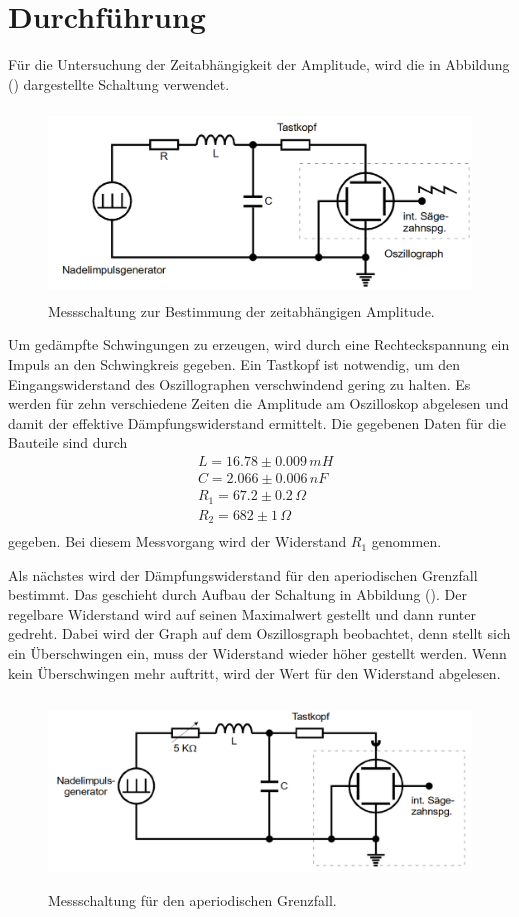 \section{Durchführung}
\label{sec:Durchführung}

Für die Untersuchung der Zeitabhängigkeit der Amplitude, wird die in Abbildung () dargestellte Schaltung verwendet.

\begin{figure}[H]
  \centering
  \includegraphics[height=5cm]{Schaltung1.png}
  \caption{Messschaltung zur Bestimmung der zeitabhängigen Amplitude. \cite[S. 11]{kent}}
\end{figure}
\noindent Um gedämpfte Schwingungen zu erzeugen, wird durch eine Rechteckspannung ein Impuls an den Schwingkreis gegeben.
Ein Tastkopf ist notwendig, um den Eingangswiderstand des Oszillographen verschwindend gering zu halten. 
Es werden für zehn verschiedene Zeiten die Amplitude am Oszilloskop abgelesen und damit der effektive Dämpfungswiderstand ermittelt.
Die gegebenen Daten für die Bauteile sind durch 
\begin{align*}
&L = 16.78 \pm 0.009 \, mH \\
&C = 2.066 \pm 0.006 \, nF \\
&R_1 = 67.2 \pm 0.2 \, \Omega \\
&R_2 = 682 \pm 1 \, \Omega \\
\end{align*}
gegeben. Bei diesem Messvorgang wird der Widerstand $R_1$ genommen.


\noindent Als nächstes wird der Dämpfungswiderstand für den aperiodischen Grenzfall bestimmt. Das geschieht durch Aufbau der Schaltung in Abbildung ().
Der regelbare Widerstand wird auf seinen Maximalwert gestellt und dann runter gedreht. Dabei wird der Graph auf dem Oszillosgraph 
beobachtet, denn stellt sich ein Überschwingen ein, muss der Widerstand wieder höher gestellt werden. Wenn kein Überschwingen mehr
auftritt, wird der Wert für den Widerstand abgelesen.
\begin{figure}[H]
  \centering
  \includegraphics[height=5cm]{Schaltung2.png}
  \caption{Messschaltung für den aperiodischen Grenzfall. \cite[S. 12]{kent}}
\end{figure}

